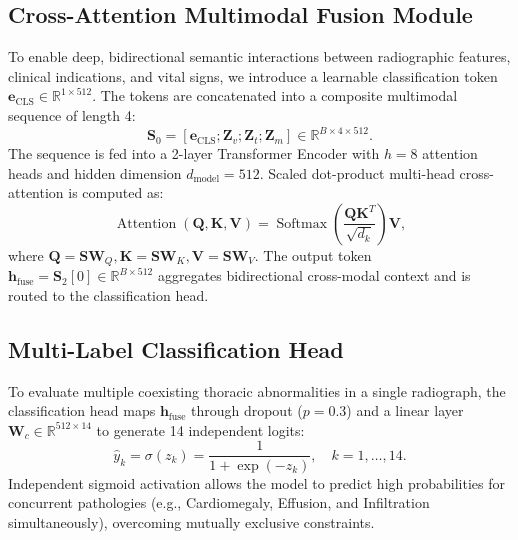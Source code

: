 \documentclass[conference]{IEEEtran}
\begin{document}
\subsection{Cross-Attention Multimodal Fusion Module}
To enable deep, bidirectional semantic interactions between radiographic features, clinical indications, and vital signs, we introduce a learnable classification token $\mathbf{e}_{\mathrm{CLS}} \in \mathbb{R}^{1 \times 512}$. The tokens are concatenated into a composite multimodal sequence of length 4:
\begin{equation}
\mathbf{S}_0 = [\mathbf{e}_{\mathrm{CLS}}; \mathbf{Z}_v; \mathbf{Z}_t; \mathbf{Z}_m] \in \mathbb{R}^{B \times 4 \times 512}.
\end{equation}
The sequence is fed into a 2-layer Transformer Encoder with $h=8$ attention heads and hidden dimension $d_{\mathrm{model}} = 512$. Scaled dot-product multi-head cross-attention is computed as:
\begin{equation}
\operatorname{Attention}(\mathbf{Q}, \mathbf{K}, \mathbf{V}) = \operatorname{Softmax}\left(\frac{\mathbf{Q}\mathbf{K}^T}{\sqrt{d_k}}\right) \mathbf{V},
\end{equation}
where $\mathbf{Q} = \mathbf{S} \mathbf{W}_Q, \mathbf{K} = \mathbf{S} \mathbf{W}_K, \mathbf{V} = \mathbf{S} \mathbf{W}_V$. The output token $\mathbf{h}_{\mathrm{fuse}} = \mathbf{S}_2[0] \in \mathbb{R}^{B \times 512}$ aggregates bidirectional cross-modal context and is routed to the classification head.

\subsection{Multi-Label Classification Head}
To evaluate multiple coexisting thoracic abnormalities in a single radiograph, the classification head maps $\mathbf{h}_{\mathrm{fuse}}$ through dropout ($p=0.3$) and a linear layer $\mathbf{W}_c \in \mathbb{R}^{512 \times 14}$ to generate 14 independent logits:
\begin{equation}
\hat{y}_k = \sigma(z_k) = \frac{1}{1 + \exp(-z_k)}, \quad k=1, \dots, 14.
\end{equation}
Independent sigmoid activation allows the model to predict high probabilities for concurrent pathologies (e.g., Cardiomegaly, Effusion, and Infiltration simultaneously), overcoming mutually exclusive constraints.
\end{document}
